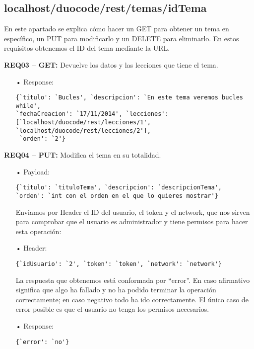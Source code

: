 \subsection{localhost/duocode/rest/temas/idTema}
En este apartado se explica cómo hacer un GET para obtener un tema en específico, un PUT para modificarlo y un DELETE para eliminarlo.
En estos requisitos obtenemos el ID del tema mediante la URL.

\textbf{REQ03 – GET:} Devuelve los datos y las lecciones que tiene el tema.
\begin{itemize}
\item[•]Response:
{\codesize
\begin{verbatim}
{`titulo': `Bucles', `descripcion': `En este tema veremos bucles while', 
`fechaCreacion': `17/11/2014', `lecciones': 
[`localhost/duocode/rest/lecciones/1', `localhost/duocode/rest/lecciones/2'],
 `orden': `2'}
\end{verbatim}
}
\end{itemize}

\textbf{REQ04 – PUT:} Modifica el tema en su totalidad.
\begin{itemize}
\item[•]Payload:
{\codesize
\begin{verbatim}
{`titulo': `tituloTema', `descripcion': `descripcionTema', 
`orden': `int con el orden en el que lo quieres mostrar'}
\end{verbatim}
}

Enviamos por Header el ID del usuario, el token y el network, que nos sirven para comprobar que el usuario es administrador y tiene permisos para hacer esta operación:
\item[•]Header: 
{\codesize
\begin{verbatim}
{`idUsuario': `2', `token': `token', `network': `network'}
\end{verbatim}
}

La respuesta que obtenemos está conformada por ``error''. En caso afirmativo significa que algo ha fallado y no ha podido terminar la operación correctamente; en caso negativo todo ha ido correctamente. El único caso de error posible es que el usuario no tenga los permisos necesarios.
\item[•]Response: 
{\codesize
\begin{verbatim}
{`error': `no'}
\end{verbatim}
}
\end{itemize}

